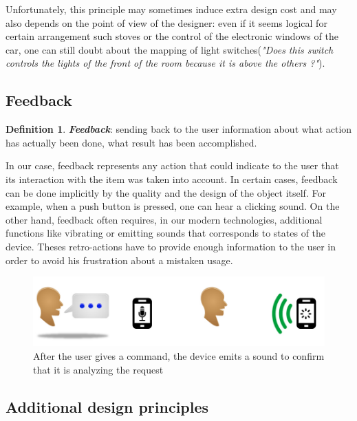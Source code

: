 \documentclass[a4paper,11pt] {article}
\theoremstyle{definition}
\begin{document}
Unfortunately, this principle may sometimes induce extra design cost and may also depends on the point of view of the designer: even if it seems logical for certain arrangement such stoves or the control of the electronic windows of the car, one can still doubt about the mapping of light switches(\textit{"Does this switch controls  the lights of the front of the room because it is above the others ?"}).

    \subsection{Feedback}
\newtheorem{mydef}{Definition}
\begin{mydef}
\textit{\textbf{Feedback}}: sending back to the user information about what action has actually been done, what result has been accomplished.
\cite{Norman02}
\end{mydef}

In our case, feedback represents any action that could indicate to the user that its interaction with the item was taken into account. In certain cases, feedback can be done implicitly by the quality and the design of the object itself. For example, when a push button is  pressed, one can hear a clicking sound. On the other hand, feedback often requires, in our modern technologies, additional functions like vibrating or emitting sounds that corresponds to states of the device. Theses retro-actions have to provide enough information to the user in order to avoid his frustration about a mistaken usage.

\begin{figure}[h]
\centering
\includegraphics[scale=0.5]{fig-report/retro-action-speaking.jpg}
\caption{After the user gives a command, the device emits a sound to confirm that it is analyzing the request}
\end{figure}

    \subsection{Additional design principles}
\end{document}
